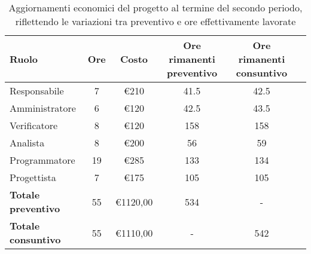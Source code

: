     \begin{table}[!h]
        \centering
        \begin{tabular}{|l| c| c| c| c| c| } 
            \hline
            \textbf{Ruolo} & \textbf{Ore} & \textbf{Costo} & \textbf{Ore rimanenti preventivo} & \textbf{Ore rimanenti consuntivo} \\
            \hline  
             Responsabile        & 7  & €210 & 41.5 & 42.5 \\ 
             Amministratore      & 6  & €120 & 42.5 & 43.5 \\ 
             Verificatore        & 8  & €120 & 158  & 158 \\ 
             Analista            & 8  & €200 & 56   & 59 \\ 
             Programmatore       & 19 & €285 & 133  & 134 \\
             Progettista         & 7  & €175 & 105  & 105 \\
            \hline
            \textbf{Totale preventivo} & 55 & €1120,00 & 534 & - \\
            \hline
            \textbf{Totale consuntivo} & 55 & €1110,00 & - & 542 \\
            \hline
        \end{tabular}
        \caption{Aggiornamenti economici del progetto al termine del secondo periodo, riflettendo le variazioni tra preventivo e ore effettivamente lavorate}
        \label{tab:7}
    \end{table}




